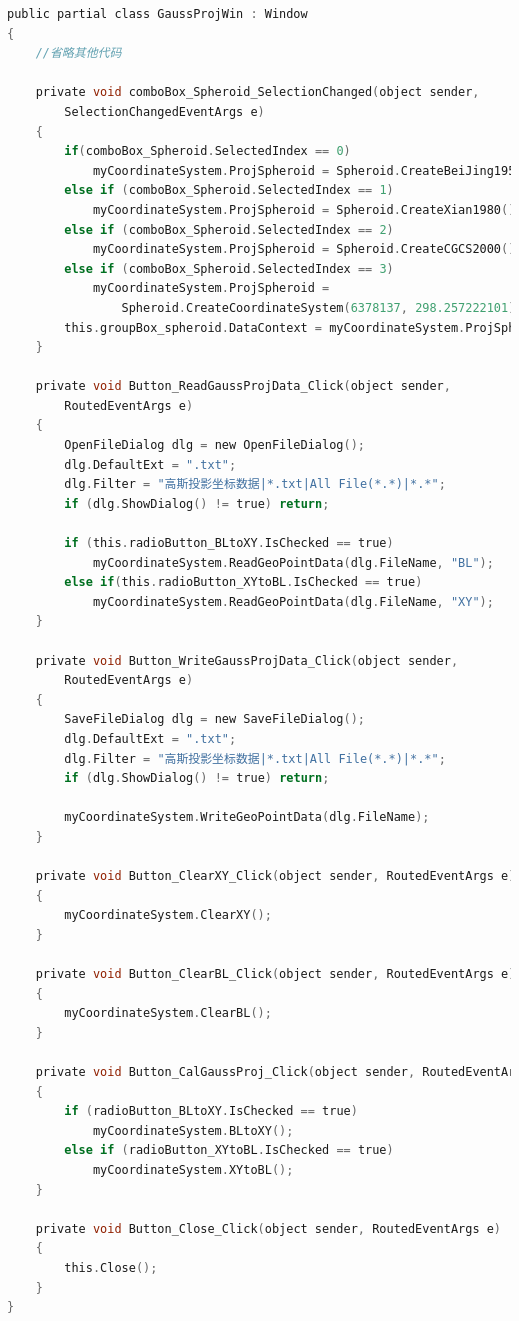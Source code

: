 \begin{lstlisting}[language=C]
public partial class GaussProjWin : Window
{   
    //省略其他代码

    private void comboBox_Spheroid_SelectionChanged(object sender, 
        SelectionChangedEventArgs e)
    {
        if(comboBox_Spheroid.SelectedIndex == 0)
            myCoordinateSystem.ProjSpheroid = Spheroid.CreateBeiJing1954();
        else if (comboBox_Spheroid.SelectedIndex == 1)
            myCoordinateSystem.ProjSpheroid = Spheroid.CreateXian1980();
        else if (comboBox_Spheroid.SelectedIndex == 2)
            myCoordinateSystem.ProjSpheroid = Spheroid.CreateCGCS2000();
        else if (comboBox_Spheroid.SelectedIndex == 3)
            myCoordinateSystem.ProjSpheroid = 
                Spheroid.CreateCoordinateSystem(6378137, 298.257222101);
        this.groupBox_spheroid.DataContext = myCoordinateSystem.ProjSpheroid;
    }

    private void Button_ReadGaussProjData_Click(object sender,
        RoutedEventArgs e)
    {
        OpenFileDialog dlg = new OpenFileDialog();
        dlg.DefaultExt = ".txt";
        dlg.Filter = "高斯投影坐标数据|*.txt|All File(*.*)|*.*";
        if (dlg.ShowDialog() != true) return;

        if (this.radioButton_BLtoXY.IsChecked == true)
            myCoordinateSystem.ReadGeoPointData(dlg.FileName, "BL");
        else if(this.radioButton_XYtoBL.IsChecked == true)
            myCoordinateSystem.ReadGeoPointData(dlg.FileName, "XY");
    }

    private void Button_WriteGaussProjData_Click(object sender, 
        RoutedEventArgs e)
    {
        SaveFileDialog dlg = new SaveFileDialog();
        dlg.DefaultExt = ".txt";
        dlg.Filter = "高斯投影坐标数据|*.txt|All File(*.*)|*.*";
        if (dlg.ShowDialog() != true) return;

        myCoordinateSystem.WriteGeoPointData(dlg.FileName);
    }

    private void Button_ClearXY_Click(object sender, RoutedEventArgs e)
    {
        myCoordinateSystem.ClearXY();
    }

    private void Button_ClearBL_Click(object sender, RoutedEventArgs e)
    {
        myCoordinateSystem.ClearBL();
    }

    private void Button_CalGaussProj_Click(object sender, RoutedEventArgs e)
    {
        if (radioButton_BLtoXY.IsChecked == true)
            myCoordinateSystem.BLtoXY();
        else if (radioButton_XYtoBL.IsChecked == true)
            myCoordinateSystem.XYtoBL();
    }

    private void Button_Close_Click(object sender, RoutedEventArgs e)
    {
        this.Close();
    }
}
\end{lstlisting}

